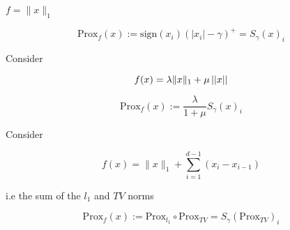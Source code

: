 \begin{example}[\(l_1\) norm]
\(f = \|x\|_1\)

\begin{equation}
\mathrm{Prox}_f\left(x\right) := \mathrm{sign}(x_i)\left(|x_i| - \gamma\right)^+ = S_\gamma\left(x\right)_i 
\end{equation}
\label{eqn:proxl1}
\end{example}

\begin{example}
Consider

\begin{equation}
f(x) = \lambda\|x\|_1 + \mu \left|\left|x\right|\right| 
\end{equation}

\begin{equation}
\mathrm{Prox}_f\left(x\right) := \frac{\lambda}{1+\mu} S_\gamma\left(x\right)_i 
\end{equation}
\end{example}

\begin{example}
Consider

\begin{equation}
f(x) = \|x\|_1 + \sum_{i=1}^{d-1} \left( x_i - x_{i-1} \right) 
\end{equation}

i.e the sum of the \(l_1\) and \(TV\) norms

\begin{equation}
\mathrm{Prox}_f\left(x\right) := \mathrm{Prox}_{l_1} \circ \mathrm{Prox}_{TV} =  S_\gamma\left(\mathrm{Prox}_{TV}\right)_i 
\end{equation}
\end{example}

